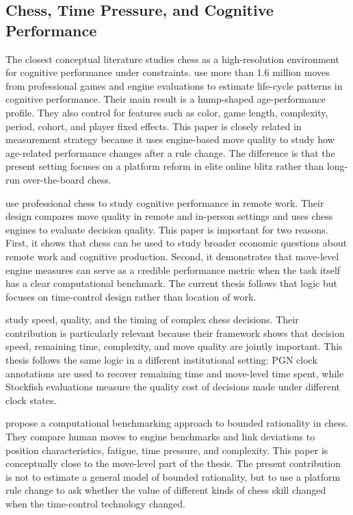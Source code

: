 \subsection{Chess, Time Pressure, and Cognitive Performance}

The closest conceptual literature studies chess as a high-resolution environment for cognitive performance under constraints. \citet{strittmatter2020lifecycle} use more than 1.6 million moves from professional games and engine evaluations to estimate life-cycle patterns in cognitive performance. Their main result is a hump-shaped age-performance profile. They also control for features such as color, game length, complexity, period, cohort, and player fixed effects. This paper is closely related in measurement strategy because it uses engine-based move quality to study how age-related performance changes after a rule change. The difference is that the present setting focuses on a platform reform in elite online blitz rather than long-run over-the-board chess.

\citet{kuenn2022remote} use professional chess to study cognitive performance in remote work. Their design compares move quality in remote and in-person settings and uses chess engines to evaluate decision quality. This paper is important for two reasons. First, it shows that chess can be used to study broader economic questions about remote work and cognitive production. Second, it demonstrates that move-level engine measures can serve as a credible performance metric when the task itself has a clear computational benchmark. The current thesis follows that logic but focuses on time-control design rather than location of work.

\citet{strittmatter2022speed} study speed, quality, and the timing of complex chess decisions. Their contribution is particularly relevant because their framework shows that decision speed, remaining time, complexity, and move quality are jointly important. This thesis follows the same logic in a different institutional setting: PGN clock annotations are used to recover remaining time and move-level time spent, while Stockfish evaluations measure the quality cost of decisions made under different clock states.

\citet{zegners2020bounded} propose a computational benchmarking approach to bounded rationality in chess. They compare human moves to engine benchmarks and link deviations to position characteristics, fatigue, time pressure, and complexity. This paper is conceptually close to the move-level part of the thesis. The present contribution is not to estimate a general model of bounded rationality, but to use a platform rule change to ask whether the value of different kinds of chess skill changed when the time-control technology changed.

